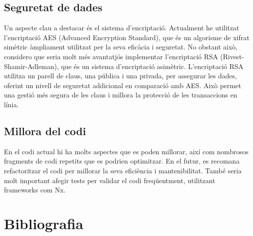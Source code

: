 \documentclass[a4paper,12pt,twoside]{ThesisStyle}
\begin{document}
\section{Seguretat de dades}
\label{sec: Seguretat de dades}

Un aspecte clau a destacar és el sistema d'encriptació. Actualment he utilitzat l'encriptació AES (Advanced Encryption Standard), que és un algorisme de xifrat simètric àmpliament utilitzat per la seva eficàcia i seguretat. No obstant això, considero que seria molt més avantatjós implementar l'encriptació RSA (Rivest-Shamir-Adleman), que és un sistema d'encriptació asimètric. L'encriptació RSA utilitza un parell de claus, una pública i una privada, per assegurar les dades, oferint un nivell de seguretat addicional en comparació amb AES. Això permet una gestió més segura de les claus i millora la protecció de les transaccions en línia.


\section{Millora del codi}
\label{sec: Millora del codi}


En el codi actual hi ha molts aspectes que es poden millorar, així com nombrosos fragments de codi repetits que es podrien optimitzar. En el futur, es recomana refactoritzar el codi per millorar la seva eficiència i mantenibilitat. També seria molt important afegir tests per validar el codi freqüentment, utilitzant frameworks com Nx.



\chapter{Bibliografia}
\label{chp:Bibliografia}









\end{document}
